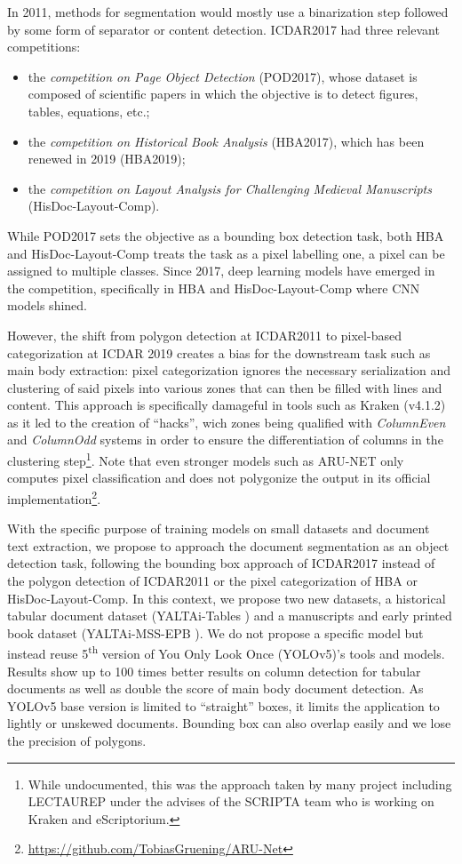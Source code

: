 \documentclass{jdmdh}
\begin{document}
In 2011, methods for segmentation would mostly use a binarization step followed by some form of separator or content detection. 
ICDAR2017 had three relevant competitions:
\begin{itemize}
    \item the \textit{competition on Page Object Detection} (POD2017), whose dataset is composed of scientific papers in which the objective is to detect figures, tables, equations, etc.;
    \item the \textit{competition on Historical Book Analysis} (HBA2017), which has been renewed in 2019 (HBA2019);
    \item the \textit{competition on Layout Analysis for Challenging Medieval Manuscripts} (HisDoc-Layout-Comp).
\end{itemize}

While POD2017 sets the objective as a bounding box detection task, both HBA and HisDoc-Layout-Comp treats the task as a pixel labelling one, a pixel can be assigned to multiple classes. Since 2017, deep learning models have emerged in the competition, specifically in HBA and HisDoc-Layout-Comp where CNN models shined. 

However, the shift from polygon detection at ICDAR2011 to pixel-based categorization at ICDAR 2019 creates a bias for the downstream task such as main body extraction: pixel categorization ignores the necessary serialization and clustering of said pixels into various zones that can then be filled with lines and content. This approach is specifically damageful in tools such as Kraken (v4.1.2) as it led to the creation of ``hacks'', wich zones being qualified with \textit{ColumnEven} and \textit{ColumnOdd} systems in order to ensure the differentiation of columns in the clustering step\footnote{While undocumented, this was the approach taken by many project including LECTAUREP under the advises of the SCRIPTA team who is working on Kraken and eScriptorium.}. Note that even stronger models such as ARU-NET \citep{gruning2018arunet} only computes pixel classification and does not polygonize the output in its official implementation\footnote{\url{https://github.com/TobiasGruening/ARU-Net}}.

With the specific purpose of training models on small datasets and document text extraction, we propose to approach the document segmentation as an object detection task, following the bounding box approach of ICDAR2017 instead of the polygon detection of ICDAR2011 or the pixel categorization of HBA or HisDoc-Layout-Comp. In this context, we propose two new datasets, a historical tabular document dataset (YALTAi-Tables \citep{clerice_thibault_2022_6827706}) and a manuscripts and early printed book dataset (YALTAi-MSS-EPB \citep{clerice2022yaltaimss}). We do not propose a specific model but instead reuse 5\textsuperscript{th} version of You Only Look Once (YOLOv5)'s tools and models. Results show up to 100 times better results on column detection for tabular documents as well as double the score of main body document detection. As YOLOv5 base version is limited to ``straight'' boxes, it limits the application to lightly or unskewed documents. Bounding box can also overlap easily and we lose the precision of polygons.
\end{document}
